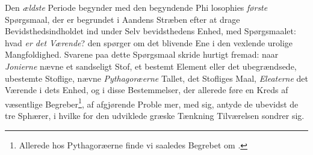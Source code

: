 Den \emph{ældste} Periode begynder med den begyndende Phi\-%
losophies \emph{første} Spørgsmaal, der er begrundet i Aandens
Stræben efter at drage Bevidsthedsindholdet ind under Selv\-%
bevidsthedens Enhed, med Spørgsmaalet: hvad \emph{er det Værende}?
den spørger om det blivende Ene i den vexlende urolige
Mangfoldighed. Svarene paa dette Spørgsmaal skride hurtigt
fremad: naar \emph{Jonierne} nævne et sandseligt Stof, et bestemt
Element eller det ubegrændsede, ubestemte Stoflige, nævne
\emph{Pythagoræerne} Tallet, det Stofliges Maal, \emph{Eleaterne} det
Værende i dets Enhed, og i disse Bestemmelser, der allerede
føre en Kreds af væsentlige Begreber\footnote{Allerede hos Pythagoræerne finde vi saaledes Begrebet om .}, af afgjørende Proble\-%
mer, med sig, antyde de ubevidst de tre Sphærer, i hvilke
for den udviklede græske Tænkning Tilværelsen sondrer sig.

